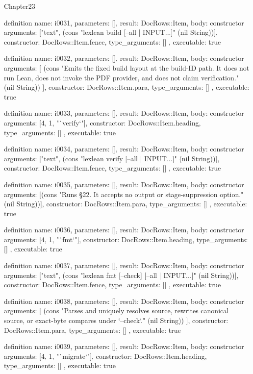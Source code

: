 \begin{lexlean}{Chapter23}
\begin{semanticmodule}
definition{
  name: i0031,
  parameters: [],
  result: DocRows::Item,
  body: constructor{
    arguments: ["text", (cons "lexlean build [--all | INPUT...]" (nil String))],
    constructor: DocRows::Item.fence,
    type_arguments: []
  },
  executable: true
}

definition{
  name: i0032,
  parameters: [],
  result: DocRows::Item,
  body: constructor{
    arguments: [
      (cons "Emits the fixed build layout at the build-ID path. It does not run Lean, does not invoke the PDF provider, and does not claim verification." (nil String))
    ],
    constructor: DocRows::Item.para,
    type_arguments: []
  },
  executable: true
}

definition{
  name: i0033,
  parameters: [],
  result: DocRows::Item,
  body: constructor{
    arguments: [4, 1, "`verify`"],
    constructor: DocRows::Item.heading,
    type_arguments: []
  },
  executable: true
}

definition{
  name: i0034,
  parameters: [],
  result: DocRows::Item,
  body: constructor{
    arguments: ["text", (cons "lexlean verify [--all | INPUT...]" (nil String))],
    constructor: DocRows::Item.fence,
    type_arguments: []
  },
  executable: true
}

definition{
  name: i0035,
  parameters: [],
  result: DocRows::Item,
  body: constructor{
    arguments: [(cons "Runs §22. It accepts no output or stage-suppression option." (nil String))],
    constructor: DocRows::Item.para,
    type_arguments: []
  },
  executable: true
}

definition{
  name: i0036,
  parameters: [],
  result: DocRows::Item,
  body: constructor{
    arguments: [4, 1, "`fmt`"],
    constructor: DocRows::Item.heading,
    type_arguments: []
  },
  executable: true
}

definition{
  name: i0037,
  parameters: [],
  result: DocRows::Item,
  body: constructor{
    arguments: ["text", (cons "lexlean fmt [--check] [--all | INPUT...]" (nil String))],
    constructor: DocRows::Item.fence,
    type_arguments: []
  },
  executable: true
}

definition{
  name: i0038,
  parameters: [],
  result: DocRows::Item,
  body: constructor{
    arguments: [
      (cons "Parses and uniquely resolves source, rewrites canonical source, or exact-byte compares under `--check`." (nil String))
    ],
    constructor: DocRows::Item.para,
    type_arguments: []
  },
  executable: true
}

definition{
  name: i0039,
  parameters: [],
  result: DocRows::Item,
  body: constructor{
    arguments: [4, 1, "`migrate`"],
    constructor: DocRows::Item.heading,
    type_arguments: []
  },
  executable: true
}


\end{semanticmodule}
\end{lexlean}
